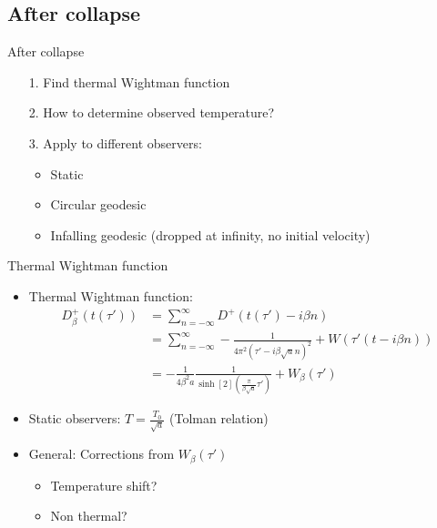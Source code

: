 \documentclass{beamer}
\begin{document}
\subsection{After collapse}
\begin{frame}{After collapse}
\begin{itemize}
	\item[1.] Find thermal Wightman function
	\item[]
	\item[2.] How to determine observed temperature?
	\item[]
	\item[3.] Apply to different observers:
	\begin{itemize}
		\item Static
		\item Circular geodesic
		\item Infalling geodesic (dropped at infinity, no initial velocity)
	\end{itemize}
\end{itemize}
\end{frame}


\begin{frame}{Thermal Wightman function}

\begin{itemize}
	\item Thermal Wightman function:
	\begin{align*}
		D_\beta^+(t(\tau')) &= \sum_{n=-\infty}^\infty D^+(t(\tau') - i \beta n)\\
			&= \sum_{n=-\infty}^\infty -\frac{1}{4\pi^2 (\tau' - i\beta \sqrt{a} n)^2} + W(\tau'(t - i\beta n))\\
			&= -\frac{1}{4\beta^2 a} \frac{1}{\sinh[2](\frac{\pi}{\beta \sqrt{a}} \tau')} + W_\beta(\tau')
	\end{align*}
	\item Static observers: \(T = \frac{T_0}{\sqrt{a}}\) (Tolman relation)
	\item General: Corrections from \(W_\beta(\tau')\)
	\begin{itemize}
		\item Temperature shift?
		\item Non thermal?
	\end{itemize}
\end{itemize}
\end{frame}
\end{document}
